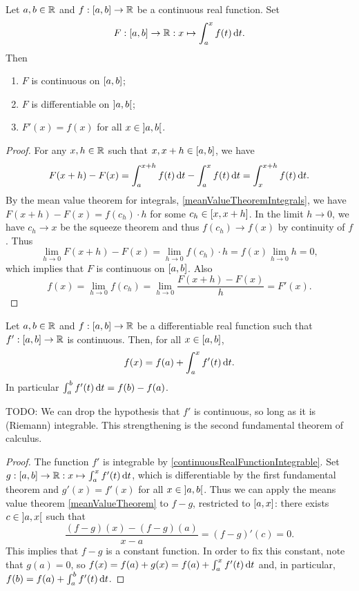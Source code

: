 \begin{theorem} \label{firstFundamentalTheoremCalculus}
Let $a,b\in \mathbb{R}$ and $f:\interval{a,b}\to \R$ be a continuous real function. Set
\[ F: \interval{a,b} \to \R: x\mapsto \int_a^x f(t) \diff{t}. \]
Then
\begin{enumerate}
\item $F$ is continuous on $\interval{a,b}$;
\item $F$ is differentiable on $\interval[o]{a,b}$;
\item $F'(x) = f(x)$ for all $x\in \interval[o]{a,b}$.
\end{enumerate}
\end{theorem}
\begin{proof}
For any $x,h\in \mathbb{R}$ such that $x, x+h\in \interval{a,b}$, we have
\[ F(x+h) - F(x) = \int_a^{x+h}f(t)\operatorname{d \!}{t} - \int_a^{x}f(t)\operatorname{d \!}{t} = \int_x^{x+h}f(t)\operatorname{d \!}{t}. \]
By the mean value theorem for integrals, \ref{meanValueTheoremIntegrals}, we have $F(x+h) - F(x) = f(c_h)\cdot h$ for some $c_h\in \interval{x,x+h}$. In the limit $h\to 0$, we have $c_h\to x$ be the squeeze theorem and thus $f(c_h)\to f(x)$ by continuity of $f$. Thus
\[ \lim_{h\to 0}F(x+h) - F(x) = \lim_{h\to 0}f(c_h)\cdot h = f(x)\lim_{h\to 0}h = 0, \]
which implies that $F$ is continuous on $\interval{a,b}$.
Also
\[ f(x) = \lim_{h\to 0}f(c_h) = \lim_{h\to 0}\frac{F(x+h) - F(x)}{h} = F'(x). \]
\end{proof}
\begin{corollary}  \label{weakSecondTheoremCalculus}
Let $a,b\in \mathbb{R}$ and $f:\interval{a,b}\to \R$ be a differentiable real function such that $f': \interval{a,b}\to \R$ is continuous. Then, for all $x\in \interval{a,b}$,
\[ f(x) = f(a) + \int_a^xf'(t)\operatorname{d \!}{t}. \]
In particular $\int_a^bf'(t)\operatorname{d \!}{t} = f(b)-f(a)$.
\end{corollary}
TODO: We can drop the hypothesis that $f'$ is continuous, so long as it is (Riemann) integrable. This strengthening is the second fundamental theorem of calculus.
\begin{proof}
The function $f'$ is integrable by \ref{continuousRealFunctionIntegrable}.
Set $g: \interval{a,b}\to \R: x\mapsto \int_a^xf'(t)\diff{t}$, which is differentiable by the first fundamental theorem and $g'(x) = f'(x)$ for all $x\in \interval[o]{a,b}$. Thus we can apply the means value theorem \ref{meanValueTheorem} to $f-g$, restricted to $\interval{a,x}$: there exists $c\in \interval[o]{a,x}$ such that
\[ \frac{(f-g)(x) - (f-g)(a)}{x-a} = (f-g)'(c) = 0. \]
This implies that $f-g$ is a constant function. In order to fix this constant, note that $g(a) = 0$, so $f(x) = f(a) + g(x) = f(a) + \int_a^xf'(t)\operatorname{d \!}{t}$ and, in particular, $f(b) = f(a) + \int_a^bf'(t)\operatorname{d \!}{t}$.
\end{proof}

